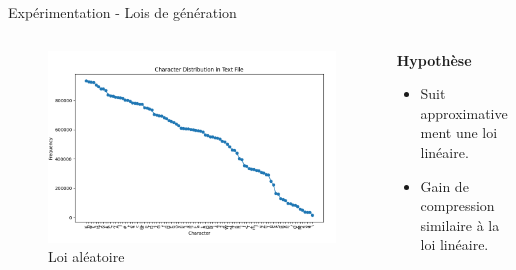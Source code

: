 \documentclass{beamer}
\begin{document}
\begin{frame}{Expérimentation - Lois de génération}
    \begin{columns}[T]
        \begin{column}{0.6\textwidth}
            \begin{figure}
                \centering
                \includegraphics[width=\textwidth]{../assets/random.png}
                \caption{Loi aléatoire}
            \end{figure}
        \end{column}
        \begin{column}{0.5\textwidth}
            \vspace{10pt}
            \textbf{Hypothèse} \\
            \vspace{20pt}
            \begin{itemize}
                \item Suit approximativement une loi linéaire.
                \item Gain de compression similaire à la loi linéaire.
            \end{itemize}
        \end{column}
    \end{columns}
\end{frame}
\end{document}
